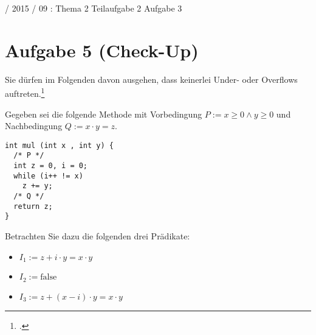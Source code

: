 \documentclass{lehramt-informatik}
\begin{document}
%

 / 2015 / 09 : Thema 2 Teilaufgabe 2 Aufgabe 3

%

\section{Aufgabe 5 (Check-Up)}

Sie dürfen im Folgenden davon ausgehen, dass keinerlei Under- oder
Overflows auftreten.\footcite[nach Frühjahr 2017 (66116) - Thema 2,
Teilaufgabe 2, Aufgabe 4]{examen:66116:2017:03}

Gegeben sei die folgende Methode mit Vorbedingung $P := x \geq 0 \land y
\geq 0$ und Nachbedingung $Q := x \cdot y = z$.

\begin{verbatim}
int mul (int x , int y) {
  /* P */
  int z = 0, i = 0;
  while (i++ != x)
    z += y;
  /* Q */
  return z;
}
\end{verbatim}

Betrachten Sie dazu die folgenden drei Prädikate:

\begin{itemize}
\item $I_1 := z + i \cdot y = x \cdot y$
\item $I_2 := \text{false}$
\item $I_3 := z + (x - i) \cdot y = x \cdot y$
\end{itemize}
\end{document}
